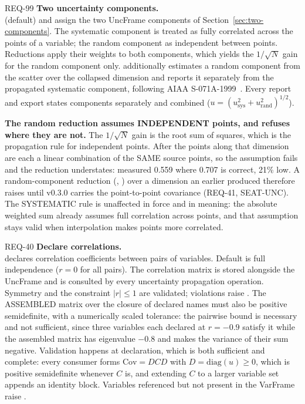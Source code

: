 \begin{reqbox}{REQ-99}{\stable}
\textbf{Two uncertainty components.}\\
 (default) and
 assign the two UncFrame components of
Section~\ref{sec:two-components}. The systematic component is treated as
fully correlated across the points of a variable; the random component as
independent between points. Reductions apply their weights to both
components, which yields the $1/\sqrt{N}$ gain for the random component
only.  additionally estimates a random component
from the scatter over the collapsed dimension and reports it separately
from the propagated systematic component, following AIAA
S-071A-1999~\citep{aiaaS071A}. Every report and export states components
separately and combined ($u = (u_{\mathrm{sys}}^2 +
u_{\mathrm{rand}}^2)^{1/2}$).

\textbf{The random reduction assumes INDEPENDENT points, and refuses
where they are not.} The $1/\sqrt{N}$ gain is the root sum of squares,
which is the propagation rule for independent points. After
 the points along that dimension are each a linear
combination of the SAME source points, so the assumption fails and the
reduction understates: measured 0.559 where 0.707 is correct, 21\% low.
A random-component reduction (, ) over a
dimension an earlier  produced therefore raises
 until v0.3.0 carries the point-to-point
covariance (REQ-41, SEAT-UNC). The SYSTEMATIC rule is unaffected in
force and in meaning: the absolute weighted sum already assumes full
correlation across points, and that assumption stays valid when
interpolation makes points more correlated.
\end{reqbox}

\begin{reqbox}{REQ-40}{\stable}
\textbf{Declare correlations.}\\
 declares
correlation coefficients between pairs of variables. Default is full
independence ($r=0$ for all pairs). The correlation matrix is stored
alongside the UncFrame and is consulted by every uncertainty
propagation operation. Symmetry and the constraint $|r| \le 1$ are
validated; violations raise . The
ASSEMBLED matrix over the closure of declared names must also be
positive semidefinite, with a numerically scaled tolerance: the
pairwise bound is necessary and not sufficient, since three variables
each declared at $r = -0.9$ satisfy it while the assembled matrix has
eigenvalue $-0.8$ and makes the variance of their sum negative.
Validation happens at declaration, which is both sufficient and
complete: every consumer forms $\mathrm{Cov} = DCD$ with $D =
\mathrm{diag}(u) \ge 0$, which is positive semidefinite whenever $C$
is, and extending $C$ to a larger variable set appends an identity
block. Variables
referenced but not present in the VarFrame raise
.
\end{reqbox}


